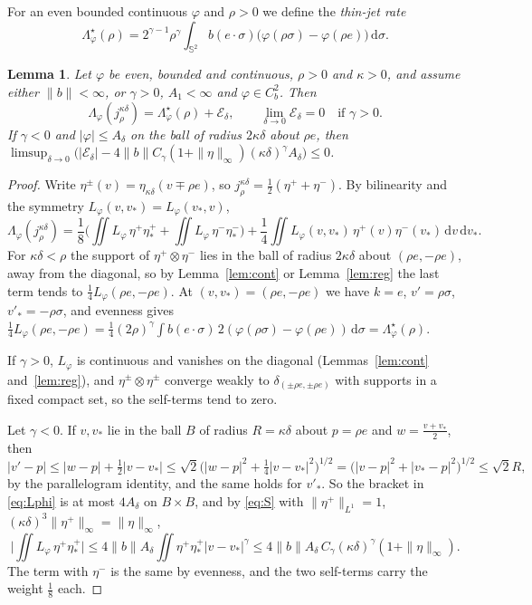 \documentclass[11pt]{amsart}
\newtheorem{lemma}[theorem]{Lemma}
\theoremstyle{definition}
\newcommand{\Sph}{\mathbb{S}}
\newcommand{\dd}{\,\mathrm{d}}
\newcommand{\nb}{\|b\|}
\begin{document}
For an even bounded continuous $\varphi$ and $\rho>0$ we define the \emph{thin-jet rate}
\begin{equation}\label{eq:Lstar}
\Lambda^\star_\varphi(\rho)=2^{\gamma-1}\rho^\gamma\int_{\Sph^2}b(e\cdot\sigma)\big(\varphi(\rho\sigma)-\varphi(\rho e)\big)\dd\sigma .
\end{equation}

\begin{lemma}\label{lem:dirac}
Let $\varphi$ be even, bounded and continuous, $\rho>0$ and $\kappa>0$, and assume either $\nb<\infty$, or $\gamma>0$, $A_1<\infty$ and $\varphi\in C^2_b$. Then
\[
\Lambda_\varphi(j^{\kappa\delta}_\rho)=\Lambda^\star_\varphi(\rho)+\mathcal E_\delta,\qquad \lim_{\delta\to0}\mathcal E_\delta=0\quad\text{if }\gamma>0 .
\]
If $\gamma<0$ and $|\varphi|\le A_\delta$ on the ball of radius $2\kappa\delta$ about $\rho e$, then $\limsup_{\delta\to0}\big(|\mathcal E_\delta|-4\nb C_\gamma(1+\|\eta\|_\infty)(\kappa\delta)^\gamma A_\delta\big)\le0$.
\end{lemma}

\begin{proof}
Write $\eta^\pm(v)=\eta_{\kappa\delta}(v\mp\rho e)$, so $j^{\kappa\delta}_\rho=\frac12(\eta^++\eta^-)$. By bilinearity and the symmetry $L_\varphi(v,v_*)=L_\varphi(v_*,v)$,
\begin{equation}\label{eq:split}
\Lambda_\varphi(j^{\kappa\delta}_\rho)=\frac18\Big(\iint L_\varphi\,\eta^+\eta^+_*+\iint L_\varphi\,\eta^-\eta^-_*\Big)+\frac14\iint L_\varphi(v,v_*)\,\eta^+(v)\eta^-(v_*)\dd v\dd v_* .
\end{equation}
For $\kappa\delta<\rho$ the support of $\eta^+\otimes\eta^-$ lies in the ball of radius $2\kappa\delta$ about $(\rho e,-\rho e)$, away from the diagonal, so by Lemma~\ref{lem:cont} or Lemma~\ref{lem:reg} the last term tends to $\frac14L_\varphi(\rho e,-\rho e)$. At $(v,v_*)=(\rho e,-\rho e)$ we have $k=e$, $v'=\rho\sigma$, $v'_*=-\rho\sigma$, and evenness gives $\frac14L_\varphi(\rho e,-\rho e)=\frac14(2\rho)^\gamma\int b(e\cdot\sigma)\,2(\varphi(\rho\sigma)-\varphi(\rho e))\dd\sigma=\Lambda^\star_\varphi(\rho)$.

If $\gamma>0$, $L_\varphi$ is continuous and vanishes on the diagonal (Lemmas~\ref{lem:cont} and~\ref{lem:reg}), and $\eta^\pm\otimes\eta^\pm$ converge weakly to $\delta_{(\pm\rho e,\pm\rho e)}$ with supports in a fixed compact set, so the self-terms tend to zero.

Let $\gamma<0$. If $v,v_*$ lie in the ball $B$ of radius $R=\kappa\delta$ about $p=\rho e$ and $w=\frac{v+v_*}2$, then
\[
|v'-p|\le|w-p|+\tfrac12|v-v_*|\le\sqrt2\Big(|w-p|^2+\tfrac14|v-v_*|^2\Big)^{1/2}=\Big(|v-p|^2+|v_*-p|^2\Big)^{1/2}\le\sqrt2R,
\]
by the parallelogram identity, and the same holds for $v'_*$. So the bracket in \eqref{eq:Lphi} is at most $4A_\delta$ on $B\times B$, and by \eqref{eq:S} with $\|\eta^+\|_{L^1}=1$, $(\kappa\delta)^3\|\eta^+\|_\infty=\|\eta\|_\infty$,
\[
\Big|\iint L_\varphi\,\eta^+\eta^+_*\Big|\le4\nb A_\delta\iint\eta^+\eta^+_*|v-v_*|^\gamma\le4\nb A_\delta\, C_\gamma(\kappa\delta)^\gamma(1+\|\eta\|_\infty).
\]
The term with $\eta^-$ is the same by evenness, and the two self-terms carry the weight $\frac18$ each.
\end{proof}
\end{document}
